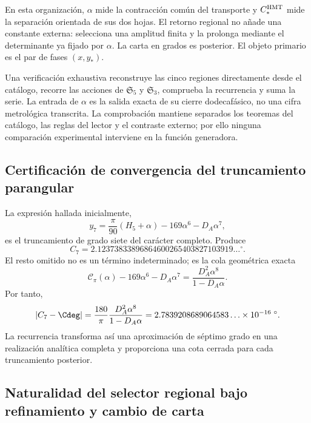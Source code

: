 En esta organización, \(\alpha\) mide la contracción común del transporte y
\(C_*^{\rm HMT}\) mide la separación orientada de sus dos hojas. El retorno
regional no añade una constante externa: selecciona una amplitud finita y la
prolonga mediante el determinante ya fijado por \(\alpha\). La carta en
grados es posterior. El objeto primario es el par de fases \((x,y_*)\).

Una verificación exhaustiva reconstruye las cinco regiones directamente
desde el catálogo, recorre las acciones de
\(\mathfrak S_5\) y \(\mathfrak S_3\), comprueba la recurrencia y suma la
serie. La entrada de \(\alpha\) es la salida exacta de su cierre
dodecafásico, no una cifra metrológica transcrita. La comprobación mantiene
separados los teoremas del catálogo, las reglas del lector y el contraste
externo; por ello ninguna comparación experimental interviene en la función
generadora.
\subsection{Certificación de convergencia del truncamiento parangular}
\label{sec:s102:c38:7:4}


La expresión hallada inicialmente,
\[
y_7=\frac\pi{90}(H_5+\alpha)-169\alpha^6-D_A\alpha^7,
\]
es el truncamiento de grado siete del carácter completo. Produce
\[
C_7=2.12373833896864600265403827103919\ldots{}^\circ.
\]
El resto omitido no es un término indeterminado; es la cola geométrica
exacta
\[
\mathscr C_\pi(\alpha)
-169\alpha^6-D_A\alpha^7
=\frac{D_A^2\alpha^8}{1-D_A\alpha}.
\]
Por tanto,
\[
\left|C_7-\Cdeg\right|
=\frac{180}{\pi}\frac{D_A^2\alpha^8}{1-D_A\alpha}
=2.7839208689064583\ldots\times10^{-16}\;{}^\circ.
\]
La recurrencia transforma así una aproximación de séptimo grado en una
realización analítica completa y proporciona una cota cerrada para cada
truncamiento posterior.

\subsection{Naturalidad del selector regional bajo refinamiento y cambio de carta}
\label{sec:s102:c38:7:5}



